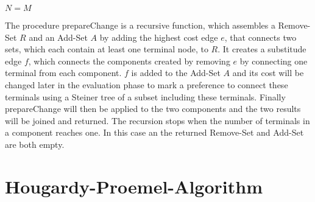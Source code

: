 \begin{algorithm}[ht]
$N=M$\;
\label{fig:constructionPseudo}
\end{algorithm}

The procedure prepareChange is a recursive function, which assembles a Remove-Set $R$ and an Add-Set $A$ by adding the highest cost edge $e$, that connects two sets, which each contain at least one terminal node, to $R$. It creates a substitude edge $f$, which connects the components created by removing $e$ by connecting one terminal from each component. $f$ is added to the Add-Set $A$ and its cost will be changed later in the evaluation phase to mark a preference to connect these terminals using a Steiner tree of a subset including these terminals. Finally prepareChange will then be applied to the two components and the two results will be joined and returned. The recursion stops when the number of terminals in a component reaches one. In this case an the returned Remove-Set and Add-Set are both empty.

\begin{algorithm}[ht]
\label{fig:prepareChangePseudo}
\end{algorithm}

\section{Hougardy-Proemel-Algorithm}

